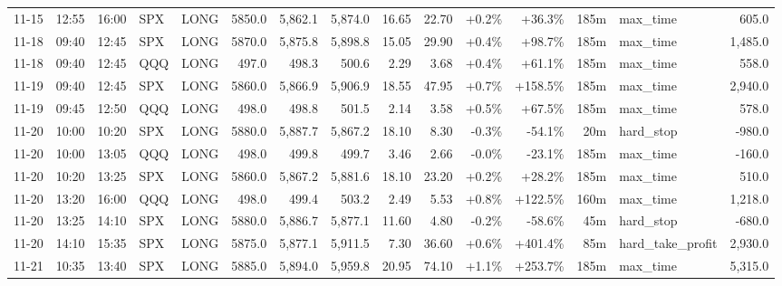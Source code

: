 \documentclass[11pt,a4paper,twoside]{article}
\begin{document}
\begin{landscape}
\begin{center}
\begin{longtable}{>{\color{txtmain}}l l l l l r r r r r r r r >{\color{txtmain}}l r}
11-15 & 12:55 & 16:00 & SPX & LONG & 5850.0 & 5,862.1 & 5,874.0 & 16.65 & 22.70 & \textcolor{wingreen}{+0.2\%} & \textcolor{wingreen}{+36.3\%} & 185m & max\_time & \textcolor{wingreen}{605.0} \\
11-18 & 09:40 & 12:45 & SPX & LONG & 5870.0 & 5,875.8 & 5,898.8 & 15.05 & 29.90 & \textcolor{wingreen}{+0.4\%} & \textcolor{wingreen}{+98.7\%} & 185m & max\_time & \textcolor{wingreen}{1,485.0} \\
11-18 & 09:40 & 12:45 & QQQ & LONG & 497.0 & 498.3 & 500.6 & 2.29 & 3.68 & \textcolor{wingreen}{+0.4\%} & \textcolor{wingreen}{+61.1\%} & 185m & max\_time & \textcolor{wingreen}{558.0} \\
11-19 & 09:40 & 12:45 & SPX & LONG & 5860.0 & 5,866.9 & 5,906.9 & 18.55 & 47.95 & \textcolor{wingreen}{+0.7\%} & \textcolor{wingreen}{+158.5\%} & 185m & max\_time & \textcolor{wingreen}{2,940.0} \\
11-19 & 09:45 & 12:50 & QQQ & LONG & 498.0 & 498.8 & 501.5 & 2.14 & 3.58 & \textcolor{wingreen}{+0.5\%} & \textcolor{wingreen}{+67.5\%} & 185m & max\_time & \textcolor{wingreen}{578.0} \\
11-20 & 10:00 & 10:20 & SPX & LONG & 5880.0 & 5,887.7 & 5,867.2 & 18.10 & 8.30 & \textcolor{lossred}{-0.3\%} & \textcolor{lossred}{-54.1\%} & 20m & hard\_stop & \textcolor{lossred}{-980.0} \\
11-20 & 10:00 & 13:05 & QQQ & LONG & 498.0 & 499.8 & 499.7 & 3.46 & 2.66 & \textcolor{lossred}{-0.0\%} & \textcolor{lossred}{-23.1\%} & 185m & max\_time & \textcolor{lossred}{-160.0} \\
11-20 & 10:20 & 13:25 & SPX & LONG & 5860.0 & 5,867.2 & 5,881.6 & 18.10 & 23.20 & \textcolor{wingreen}{+0.2\%} & \textcolor{wingreen}{+28.2\%} & 185m & max\_time & \textcolor{wingreen}{510.0} \\
11-20 & 13:20 & 16:00 & QQQ & LONG & 498.0 & 499.4 & 503.2 & 2.49 & 5.53 & \textcolor{wingreen}{+0.8\%} & \textcolor{wingreen}{+122.5\%} & 160m & max\_time & \textcolor{wingreen}{1,218.0} \\
11-20 & 13:25 & 14:10 & SPX & LONG & 5880.0 & 5,886.7 & 5,877.1 & 11.60 & 4.80 & \textcolor{lossred}{-0.2\%} & \textcolor{lossred}{-58.6\%} & 45m & hard\_stop & \textcolor{lossred}{-680.0} \\
11-20 & 14:10 & 15:35 & SPX & LONG & 5875.0 & 5,877.1 & 5,911.5 & 7.30 & 36.60 & \textcolor{wingreen}{+0.6\%} & \textcolor{wingreen}{+401.4\%} & 85m & hard\_take\_profit & \textcolor{wingreen}{2,930.0} \\
11-21 & 10:35 & 13:40 & SPX & LONG & 5885.0 & 5,894.0 & 5,959.8 & 20.95 & 74.10 & \textcolor{wingreen}{+1.1\%} & \textcolor{wingreen}{+253.7\%} & 185m & max\_time & \textcolor{wingreen}{5,315.0} \\

\end{longtable}
\end{center}
\end{landscape}
\end{document}

